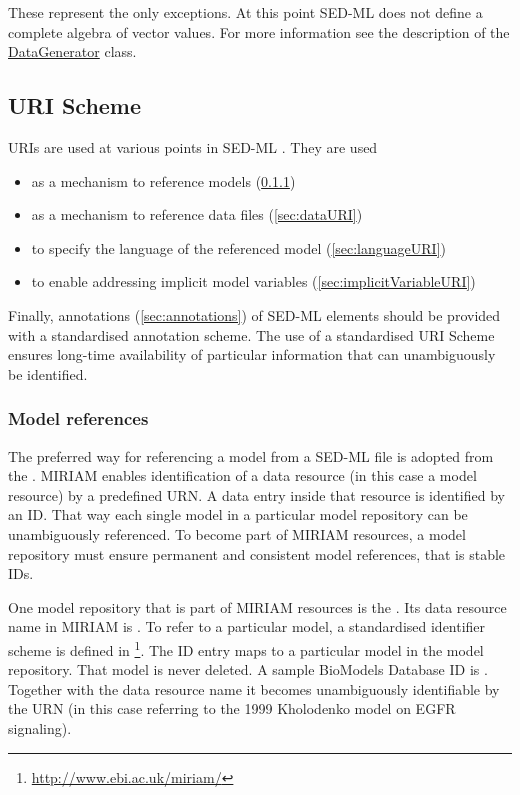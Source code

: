 These represent the only exceptions. At this point SED-ML \currentLV does not define a complete algebra of vector values. For more information see the description of the \hyperref[class:dataGenerator]{DataGenerator} class.
  
  
\subsection{URI Scheme}  
\label{sec:uriScheme}

URIs are used at various points in SED-ML \currentLV. They are used 
\begin{itemize}
	\item as a mechanism to reference models (\ref{sec:modelURI})
	\item as a mechanism to reference data files (\ref{sec:dataURI})
	\item to specify the language of the referenced model (\ref{sec:languageURI})
	\item to enable addressing implicit model variables (\ref{sec:implicitVariableURI})
\end{itemize}

Finally, annotations (\ref{sec:annotations}) of SED-ML elements should be provided with a standardised annotation scheme. The use of a standardised URI Scheme ensures long-time availability of particular information that can unambiguously be identified. 

\subsubsection{Model references}
\label{sec:modelURI}
The preferred way for referencing a model from a SED-ML file is adopted from the . MIRIAM enables identification of a data resource (in this case a model resource) by a predefined URN. A data entry inside that resource is identified by an ID. That way each single  model  in a particular model repository can be unambiguously referenced. To become part of MIRIAM resources, a model repository must ensure permanent and consistent model references, that is stable IDs.

One model repository that is part of MIRIAM resources is the  \citep{LDR+10}. Its data resource name in MIRIAM is . To refer to a particular model, a standardised identifier scheme is defined in \footnote{\url{http://www.ebi.ac.uk/miriam/}}. The ID entry maps to a particular model in the model repository. That model is never deleted. A sample BioModels Database ID is . Together with the data resource name it becomes unambiguously identifiable by the URN  (in this case referring to the 1999 Kholodenko model on EGFR signaling). 

